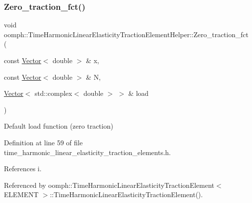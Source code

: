\subsubsection{\texorpdfstring{Zero\+\_\+traction\+\_\+fct()}{Zero\_traction\_fct()}}
{\footnotesize\ttfamily void oomph\+::\+Time\+Harmonic\+Linear\+Elasticity\+Traction\+Element\+Helper\+::\+Zero\+\_\+traction\+\_\+fct (\begin{DoxyParamCaption}\item[{const \hyperlink{classoomph_1_1Vector}{Vector}$<$ double $>$ \&}]{x,  }\item[{const \hyperlink{classoomph_1_1Vector}{Vector}$<$ double $>$ \&}]{N,  }\item[{\hyperlink{classoomph_1_1Vector}{Vector}$<$ std\+::complex$<$ double $>$ $>$ \&}]{load }\end{DoxyParamCaption})}



Default load function (zero traction) 



Definition at line 59 of file time\+\_\+harmonic\+\_\+linear\+\_\+elasticity\+\_\+traction\+\_\+elements.\+h.



References i.



Referenced by oomph\+::\+Time\+Harmonic\+Linear\+Elasticity\+Traction\+Element$<$ E\+L\+E\+M\+E\+N\+T $>$\+::\+Time\+Harmonic\+Linear\+Elasticity\+Traction\+Element().


